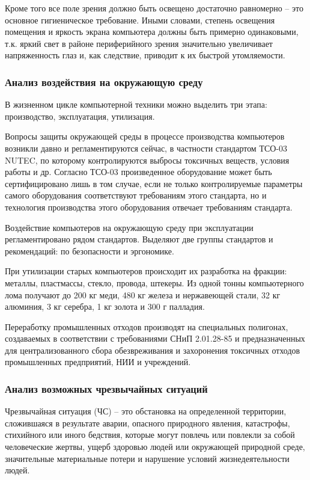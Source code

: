 Кроме того все поле зрения должно быть освещено достаточно равномерно – это основное гигиеническое требование. Иными словами, степень освещения помещения и яркость экрана компьютера должны быть примерно одинаковыми, т.к. яркий свет в районе периферийного зрения значительно увеличивает напряженность глаз и, как следствие, приводит к их быстрой утомляемости.

\subsubsection{Анализ воздействия на окружающую среду}

В жизненном цикле компьютерной техники можно выделить три этапа: производство, эксплуатация, утилизация.

Вопросы защиты окружающей среды в процессе производства компьютеров возникли давно и регламентируются сейчас, в частности стандартом ТСО-03 NUTEC, по которому контролируются выбросы токсичных веществ, условия работы и др.
Согласно ТСО-03 произведенное оборудование может быть сертифицировано лишь в том случае, если не только контролируемые параметры самого оборудования соответствуют требованиям этого стандарта, но и технология производства этого оборудования отвечает требованиям стандарта.

Воздействие компьютеров на окружающую среду при эксплуатации регламентировано рядом стандартов.
Выделяют две группы стандартов и рекомендаций: по безопасности и эргономике.

При утилизации старых компьютеров происходит их разработка на фракции: металлы, пластмассы, стекло, провода, штекеры.
Из одной тонны компьютерного лома получают до 200 кг меди, 480 кг железа и нержавеющей стали, 32 кг алюминия, 3 кг серебра, 1 кг золота и 300 г палладия.

Переработку промышленных отходов производят на специальных полигонах, создаваемых в соответствии с требованиями СНиП 2.01.28-85 и предназначенных для централизованного сбора обезвреживания и захоронения токсичных отходов промышленных предприятий, НИИ и учреждений.

\subsubsection{Анализ возможных чрезвычайных ситуаций}

Чрезвычайная ситуация (ЧС) – это обстановка на определенной территории, сложившаяся в результате аварии, опасного природного явления, катастрофы, стихийного или иного бедствия, которые могут повлечь или повлекли за собой человеческие жертвы, ущерб здоровью людей или окружающей природной среде, значительные материальные потери и нарушение условий жизнедеятельности людей.

